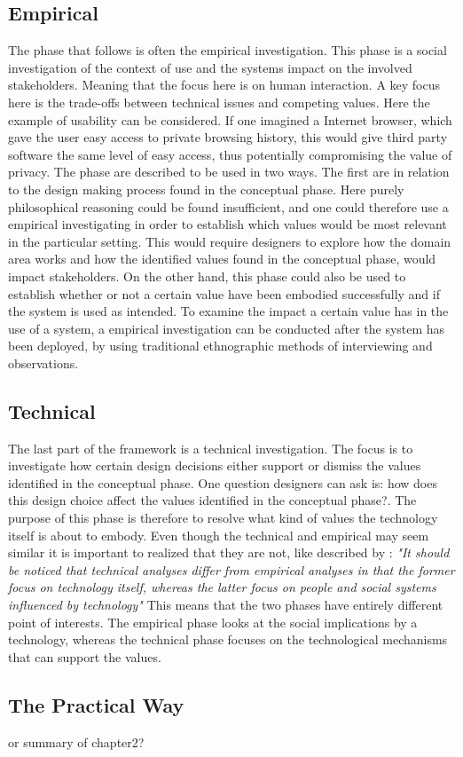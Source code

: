 \subsection{Empirical}
The phase that follows is often the empirical investigation. This phase is a social investigation of the context of use and the systems impact on the involved stakeholders. Meaning that the focus here is on human interaction. A key focus here is the trade-offs between technical issues and competing values. Here the example of usability can be considered. If one imagined a Internet browser, which gave the user easy access to private browsing history, this would give third party software the same level of easy access, thus potentially compromising the value of privacy.\newline
The phase are described to be used in two ways. The first are in relation to the design making process found in the conceptual phase. Here purely philosophical reasoning could be found insufficient, and one could therefore use a empirical investigating in order to establish which values would be most relevant in the particular setting. This would require designers to explore how the domain area works and how the identified values found in the conceptual phase, would impact stakeholders. \newline
On the other hand, this phase could also be used to establish whether or not a certain value have been embodied successfully and if the system is used as intended. To examine the impact a certain value has in the use of a system, a empirical investigation can be conducted after the system has been deployed, by using traditional ethnographic methods of interviewing and observations.

\subsection{Technical}
The last  part of the framework is a technical investigation. The focus is to investigate how certain design decisions either support or dismiss the values identified in the conceptual phase. One question designers can ask is: how does this design choice affect the values identified in the conceptual phase?. The purpose of this phase is therefore to resolve what kind of values the technology itself is about to embody. Even though the technical and empirical may seem similar it is important to realized that they are not, like described by \citet[p. 67]{EthicsAndTechnologyDesign}: \textit{"It should be noticed that technical analyses differ from empirical analyses in that the former focus on technology itself, whereas the latter focus on people and social systems influenced by technology"}\newline
This means that the two phases have entirely different point of interests. The empirical phase looks at the social implications by a technology, whereas the technical phase focuses on the technological mechanisms that can support the values. 

\subsection{The Practical Way}

 or summary of chapter2?
